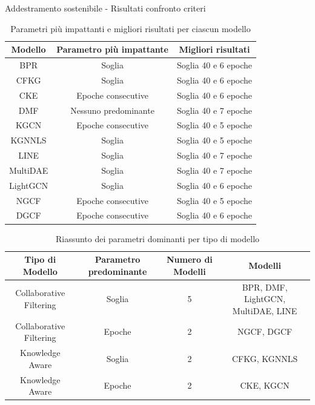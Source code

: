 \begin{frame}{Addestramento sostenibile - Risultati confronto criteri}
\tiny
\begin{table}[H]
    \centering
    \begin{tabular}{|c|c|c|}
        \hline
        \textbf{Modello} & \textbf{Parametro più impattante} & \textbf{Migliori risultati} \\
        \hline
        BPR & Soglia & Soglia 40 e 6 epoche \\
        \hline
        CFKG & Soglia & Soglia 40 e 6 epoche \\
        \hline
        CKE & Epoche consecutive & Soglia 40 e 6 epoche \\
        \hline
        DMF & Nessuno predominante & Soglia 40 e 7 epoche \\
        \hline
        KGCN & Epoche consecutive & Soglia 40 e 5 epoche \\
        \hline
        KGNNLS & Soglia & Soglia 40 e 5 epoche \\
        \hline
        LINE & Soglia & Soglia 40 e 7 epoche \\
        \hline
        MultiDAE & Soglia & Soglia 40 e 7 epoche \\
        \hline
        LightGCN & Soglia & Soglia 40 e 6 epoche \\
        \hline
        NGCF & Epoche consecutive & Soglia 40 e 5 epoche \\
        \hline
        DGCF & Epoche consecutive & Soglia 40 e 6 epoche \\
        \hline
    \end{tabular}
    \caption{Parametri più impattanti e migliori risultati per ciascun modello}
\end{table}

\tiny
\begin{table}[H]
    \centering
        \begin{tabular}{|c|c|c|c|}
            \hline
            \textbf{Tipo di Modello} & \textbf{Parametro predominante} & \textbf{Numero di Modelli} & \textbf{Modelli} \\ \hline
            Collaborative Filtering & Soglia & 5 & BPR, DMF, LightGCN, MultiDAE, LINE \\ \hline
            Collaborative Filtering & Epoche & 2 & NGCF, DGCF \\ \hline
            Knowledge Aware & Soglia & 2 & CFKG, KGNNLS \\ \hline
            Knowledge Aware & Epoche & 2 & CKE, KGCN \\ \hline
        \end{tabular}
    \caption{Riassunto dei parametri dominanti per tipo di modello}
\end{table}

\end{frame}